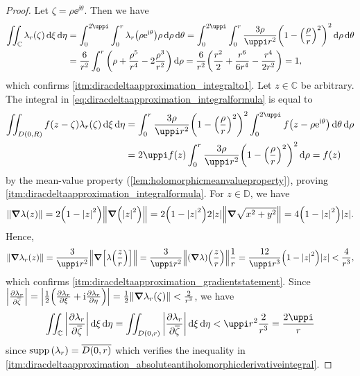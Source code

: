 \begin{proof}
    Let \(\zeta=\rho\ee^{\ii\theta}\). Then we have
    \begin{align*}
        \iint_{\mathbb{C}}\lambda_r(\zeta)\dd{\xi}\dd{\eta} & =\int_{0}^{2\uppi}\int_0^r\lambda_r\qty(\rho\ee^{\ii\theta})\rho\dd{\rho}\dd{\theta}=\int_{0}^{2\uppi}\int_0^r\frac{3\rho}{\uppi r^2}\qty(1-\qty(\frac{\rho}{r})^2)^2\dd{\rho}\dd{\theta} \\
        & =\frac{6}{r^2}\int_0^r\qty(\rho+\frac{\rho^5}{r^4}-2\frac{\rho^3}{r^2})\dd{\rho}=\frac{6}{r^2}\qty(\frac{r^2}{2}+\frac{r^6}{6r^4}-\frac{r^4}{2r^2})=1,
    \end{align*}
    which confirms \cref{itm:diracdeltaapproximation_integralto1}. Let \(z\in\mathbb{C}\) be arbitrary. The integral in \cref{eq:diracdeltaapproximation_integralformula} is equal to
    \begin{align*}
        \iint_{D(0,R)}f(z-\zeta)\lambda_r(\zeta)\dd{\xi}\dd{\eta} & =\int_0^r\frac{3\rho}{\uppi r^2}\qty(1-\qty(\frac{\rho}{r})^2)^2\int_0^{2\uppi}f\qty(z-\rho\ee^{\ii\theta})\dd{\theta}\dd{\rho} \\
        & =2\uppi f(z)\int_0^r\frac{3\rho}{\uppi r^2}\qty(1-\qty(\frac{\rho}{r})^2)^2\dd{\rho}=f(z)
    \end{align*} by the mean-value property (\cref{lem:holomorphicmeanvalueproperty}), proving \cref{itm:diracdeltaapproximation_integralformula}. For \(z\in\mathbb{D}\), we have \[\norm{\grad{\lambda(z)}}=
    2\qty(1-\abs{z}^2)\norm{\grad(\abs{z}^2)}=2\qty(1-\abs{z}^2)2\abs{z}\norm{\grad\sqrt{x^2+y^2}}=4\qty(1-\abs{z}^2)\abs{z}.\]
    Hence, \[\norm{\grad\lambda_r(z)}=\frac{3}{\uppi
        r^2}\norm{\grad\qty[\lambda\qty(\frac{z}{r})]}=\frac{3}{\uppi
        r^2}\norm{(\grad\lambda)\qty(\frac{z}{r})}\frac{1}{r}=\frac{12}{\uppi
    r^3}\qty(1-\abs{z}^2)\abs{z}<\frac{4}{r^3},\] which confirms \cref{itm:diracdeltaapproximation_gradientstatement}. Since \(\abs{\pdv{\lambda_r}{\overline{\zeta}}}=\abs{\frac{1}{2}\qty(\pdv{\lambda_r}{\xi}+\mathrm{i}\pdv{\lambda_r}{\eta})}=\frac{1}{2}\norm{\grad\lambda_r(\zeta)}<\frac{2}{r^3}\), we have \[\iint_{\mathbb{C}}\abs{\pdv{\lambda_r}{\overline{\zeta}}}\dd{\xi}\dd{\eta}=\iint_{D(0,r)}\abs{\pdv{\lambda_r}{\overline{\zeta}}}\dd{\xi}\dd{\eta}<\uppi r^2\frac{2}{r^3}=\frac{2\uppi}{r}\] since \(\operatorname{supp}\qty(\lambda_r)=\overline{D(0,r)}\) which verifies the inequality in \cref{itm:diracdeltaapproximation_absoluteantiholomorphicderivativeintegral}.


\end{proof}
